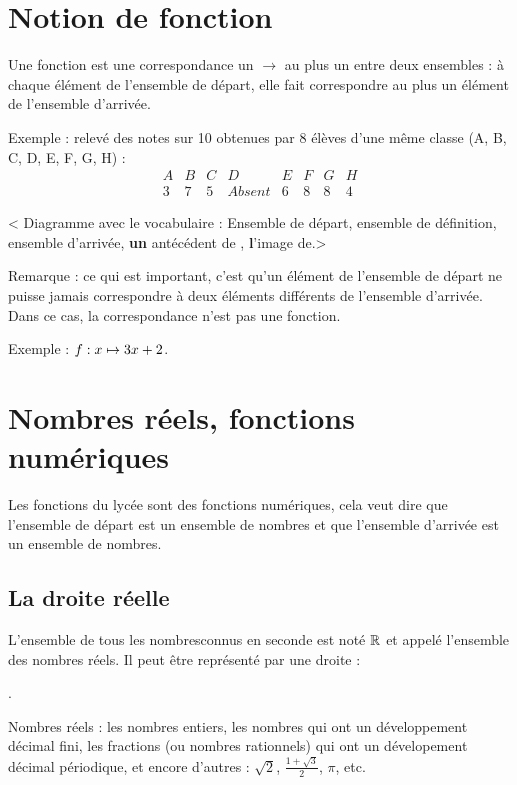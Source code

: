 \documentclass[a4paper,11pt,DIV18,BCOR0mm]{scrartcl}
\begin{document}
\section{Notion de fonction}
Une fonction est une correspondance \og un $\longrightarrow$ au plus un\fg{}
entre deux ensembles : à chaque élément de l'ensemble de départ, elle fait correspondre 
au plus un élément de l'ensemble d'arrivée.

Exemple : relevé des notes sur 10 obtenues par 8 élèves d'une même classe (A, B, C, D, E, F, G, H) :
\[
\begin{array}{c|c|c|c|c|c|c|c}
 A&B&C&D&E&F&G&H\\\hline
 3&7&5&Absent&6&8&8&4
\end{array}
\]
\vfill\begin{center}
< Diagramme avec le vocabulaire : Ensemble de départ, ensemble de définition, ensemble d'arrivée,
\textbf{un} antécédent de , \textbf{l}'image de.>
\end{center}
\vfill
Remarque : ce qui est important, c'est qu'un élément de l'ensemble de départ ne puisse jamais correspondre 
à deux éléments différents de l'ensemble d'arrivée. Dans ce cas, la correspondance n'est pas une fonction.

Exemple : $f:x\mapsto 3x+2$.


\pagebreak
\section{Nombres réels, fonctions numériques}
Les fonctions du lycée sont des fonctions numériques, cela veut dire que l'ensemble de départ est un ensemble de nombres
et que l'ensemble d'arrivée est un ensemble de nombres.

\subsection{La droite réelle}
L'\og ensemble de tous les nombres\fg connus en seconde est noté $\mathbb{R}$ et appelé l'ensemble des nombres réels. Il peut être représenté par une droite :

.


\begin{exemple}
Nombres réels : les nombres entiers, les nombres qui ont
un développement décimal fini, les fractions (ou nombres rationnels)
qui ont un dévelopement décimal périodique,
et encore d'autres : $\sqrt{2}$, $\frac{1+\sqrt{3}}{2}$,
$\pi$, etc.
\end{exemple}
\end{document}
